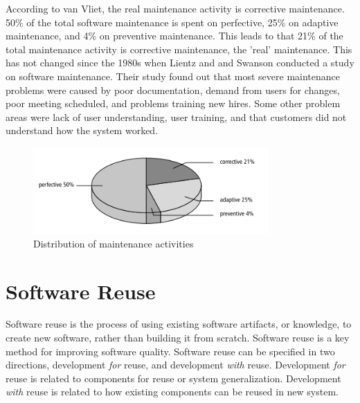 According to van Vliet, the real maintenance activity is corrective maintenance\cite{Vliet:2008:SEP:1481475}. 50\% of the total software maintenance is spent on perfective, 25\% on adaptive maintenance, and 4\% on preventive maintenance. This leads to that 21\% of the total maintenance activity is corrective maintenance, the 'real' maintenance\cite{Vliet:2008:SEP:1481475}. This has not changed since the 1980s when Lientz and and Swanson conducted a study on software maintenance\cite{lientz1980software}. Their study found out that most severe maintenance problems were caused by poor documentation, demand from users for changes, poor meeting scheduled, and problems training new hires. Some other problem areas were lack of user understanding, user training, and that customers did not understand how the system worked.

\begin{figure}
	\centering
	\includegraphics[width=0.8\textwidth]{images/maintenance.png}
	\caption{Distribution of maintenance activities\cite{Vliet:2008:SEP:1481475}}
	\label{fig:maintenanceActivities}
\end{figure}





\section{Software Reuse}
\label{sec:2-SR}
Software reuse is the process of using existing software artifacts, or knowledge, to create new software, rather than building it from scratch. Software reuse is a key method for improving software quality\cite{frakes1996software}. Software reuse can be specified in two directions, development \textit{for} reuse, and development \textit{with} reuse\cite{Slyngstad:2006:ESD:1159733.1159770}. Development \textit{for} reuse is related to components for reuse or system generalization. Development \textit{with} reuse is related to how existing components can be reused in new system.

